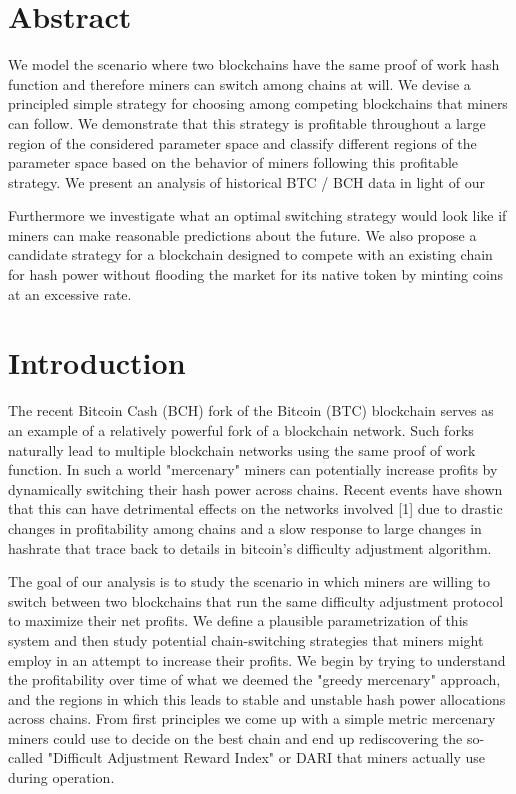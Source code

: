 \documentclass[10pt, preprint]{aastex}
\begin{document}
\section{Abstract}
We model the scenario where two blockchains have the same proof of work hash function and therefore miners can switch among chains at will.  We devise a principled simple strategy for choosing among competing blockchains that miners can follow.  We demonstrate that this strategy is profitable throughout a large region of the considered parameter space and classify different regions of the parameter space based on the behavior of miners following this profitable strategy.  We present an analysis of historical BTC / BCH data in light of our 

Furthermore we investigate what an optimal switching strategy would look like if miners can make reasonable predictions about the future.  We also propose a candidate strategy for a blockchain designed to compete with an existing chain for hash power without flooding the market for its native token by minting coins at an excessive rate.

\section{Introduction}
The recent Bitcoin Cash (BCH) fork of the Bitcoin (BTC) blockchain serves as an example of a relatively powerful fork of a blockchain network.  Such forks naturally lead to multiple blockchain networks using the same proof of work function.  In such a world "mercenary" miners can potentially increase profits by dynamically switching their hash power across chains.  Recent events have shown that this can have detrimental effects on the networks involved [1] due to drastic changes in profitability among chains and a slow response to large changes in hashrate that trace back to details in bitcoin's difficulty adjustment algorithm.

The goal of our analysis is to study the scenario in which miners are willing to switch between two blockchains that run the same difficulty adjustment protocol to maximize their net profits.  We define a plausible parametrization of this system and then study potential chain-switching strategies that miners might employ in an attempt to increase their profits.  We begin by trying to understand the profitability over time of what we deemed the "greedy mercenary" approach, and the regions in which this leads to stable and unstable hash power allocations across chains.  From first principles we come up with a simple metric mercenary miners could use to decide on the best chain and end up rediscovering the so-called "Difficult Adjustment Reward Index" or DARI that miners actually use during operation. 
\end{document}
